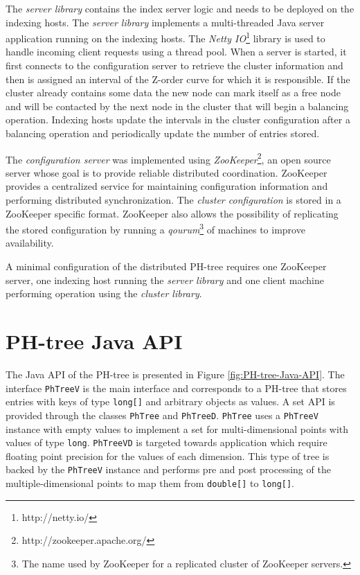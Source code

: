 \documentclass[11pt,a4paper]{globis-book}
\begin{document}
The \textit{server library} contains the index server logic and needs to be deployed on the indexing hosts. The \textit{server library} implements a multi-threaded Java server application running on the indexing hosts. The \textit{Netty IO}\footnote{http://netty.io/} library is used to handle incoming client requests using a thread pool. When a server is started, it first connects to the configuration server to retrieve the cluster information and then is assigned an interval of the Z-order curve for which it is responsible. If the cluster already contains some data the new node can mark itself as a free node and will be contacted by the next node in the cluster that will begin a balancing operation. Indexing hosts update the intervals in the cluster configuration after a balancing operation and periodically update the number of entries stored. 

The \textit{configuration server} was implemented using \textit{ZooKeeper}\footnote{http://zookeeper.apache.org/}, an open source server whose goal is to provide reliable distributed coordination. ZooKeeper provides a centralized service for maintaining configuration information and performing distributed synchronization. The \textit{cluster configuration} is stored in a ZooKeeper specific format. ZooKeeper also allows the possibility of replicating the stored configuration by running a \textit{qourum}\footnote{The name used by ZooKeeper for a replicated cluster of ZooKeeper servers.} of machines to improve availability. 

A minimal configuration of the distributed PH-tree requires one ZooKeeper server, one indexing host running the \textit{server library} and one client machine performing operation using the \textit{cluster library}.

\section{PH-tree Java API}

The Java API of the PH-tree is presented in Figure \ref{fig:PH-tree-Java-API}. The interface \texttt{PhTreeV} is the main interface and corresponds to a PH-tree that stores entries with keys of type \texttt{long[]} and arbitrary objects as values. A set API is provided through the classes \texttt{PhTree} and \texttt{PhTreeD}. \texttt{PhTree} uses a \texttt{PhTreeV} instance with empty values to implement a set for multi-dimensional points with values of type \texttt{long}. \texttt{PhTreeVD} is targeted towards application which require floating point precision for the values of each dimension. This type of tree is backed by the \texttt{PhTreeV} instance and performs pre and post processing of the multiple-dimensional points to map them from \texttt{double[]} to \texttt{long[]}.
\end{document}
